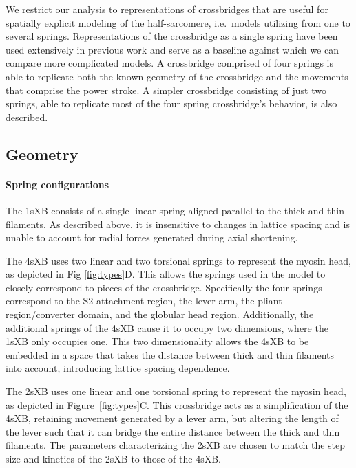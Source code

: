 \documentclass[]{article}
\begin{document}
We restrict our analysis to representations of crossbridges that are useful for spatially explicit modeling of the half-sarcomere, i.e.\ models utilizing from one to several springs.
Representations of the crossbridge as a single spring have been used extensively in previous work and serve as a baseline against which we can compare more complicated models.
A crossbridge comprised of four springs is able to replicate both the known geometry of the crossbridge and the movements that comprise the power stroke.
A simpler crossbridge consisting of just two springs, able to replicate most of the four spring crossbridge's behavior, is also described.

\subsection*{Geometry} %

\paragraph{Spring configurations} %
The 1sXB consists of a single linear spring aligned parallel to the thick and thin filaments.
As described above, it is insensitive to changes in lattice spacing and is unable to account for radial forces generated during axial shortening.

The 4sXB uses two linear and two torsional springs to represent the myosin head, as depicted in Fig \ref{fig:types}D.
This allows the springs used in the model to closely correspond to pieces of the crossbridge.
Specifically the four springs correspond to the S2 attachment region, the lever arm, the pliant region/converter domain, and the globular head region.
Additionally, the additional springs of the 4sXB cause it to occupy two dimensions, where the 1sXB only occupies one.
This two dimensionality allows the 4sXB to be embedded in a space that takes the distance between thick and thin filaments into account, introducing lattice spacing dependence.

The 2sXB uses one linear and one torsional spring to represent the myosin head, as depicted in Figure~\ref{fig:types}C.
This crossbridge acts as a simplification of the 4sXB, retaining movement generated by a lever arm, but altering the length of the lever such that it can bridge the entire distance between the thick and thin filaments.
The parameters characterizing the 2sXB are chosen to match the step size and kinetics of the 2sXB to those of the 4sXB.
\end{document}

